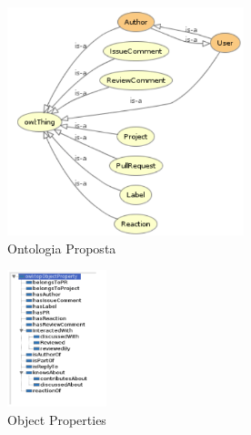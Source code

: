 \documentclass[a4paper,12pt]{monografia}
\theoremstyle{plain}
\theoremstyle{definition}
\theoremstyle{remark}
\begin{document}
\begin{figure}[!htbp]
\centering
 \includegraphics[height=250]{ontologia}
 \caption{Ontologia Proposta}\label{fig:ontologia}
\end{figure}


\begin{figure}[!htbp]
 \centering
 \includegraphics[height=150]{object_properties}
 \caption{Object Properties}\label{fig:object_properties}
\end{figure}
\end{document}
